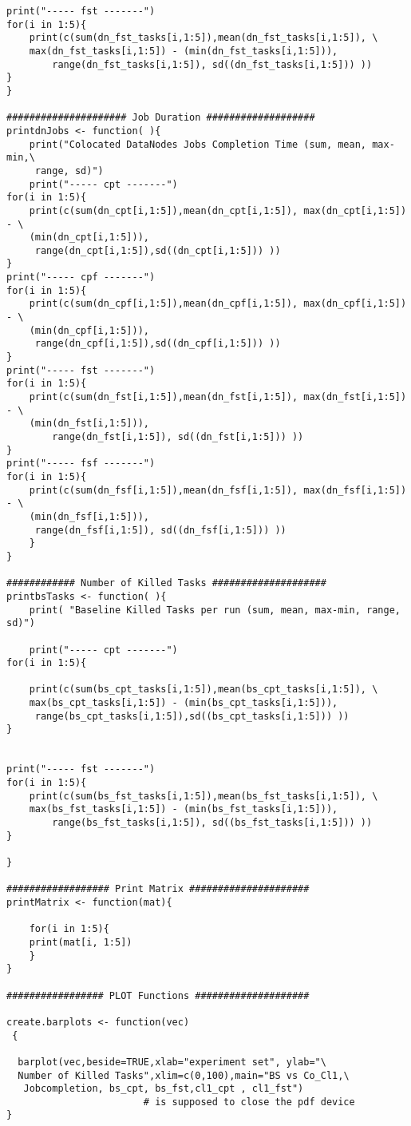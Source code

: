 \begin{verbatim}
print("----- fst -------")
for(i in 1:5){
	print(c(sum(dn_fst_tasks[i,1:5]),mean(dn_fst_tasks[i,1:5]), \
	max(dn_fst_tasks[i,1:5]) - (min(dn_fst_tasks[i,1:5])), 
		range(dn_fst_tasks[i,1:5]), sd((dn_fst_tasks[i,1:5])) ))
}
}

##################### Job Duration ###################
printdnJobs <- function( ){
	print("Colocated DataNodes Jobs Completion Time (sum, mean, max-min,\
	 range, sd)")
	print("----- cpt -------")
for(i in 1:5){
	print(c(sum(dn_cpt[i,1:5]),mean(dn_cpt[i,1:5]), max(dn_cpt[i,1:5]) - \
	(min(dn_cpt[i,1:5])),
	 range(dn_cpt[i,1:5]),sd((dn_cpt[i,1:5])) ))
}
print("----- cpf -------")
for(i in 1:5){
	print(c(sum(dn_cpf[i,1:5]),mean(dn_cpf[i,1:5]), max(dn_cpf[i,1:5]) - \
	(min(dn_cpf[i,1:5])),
	 range(dn_cpf[i,1:5]),sd((dn_cpf[i,1:5])) ))
}
print("----- fst -------")
for(i in 1:5){
	print(c(sum(dn_fst[i,1:5]),mean(dn_fst[i,1:5]), max(dn_fst[i,1:5]) - \
	(min(dn_fst[i,1:5])), 
		range(dn_fst[i,1:5]), sd((dn_fst[i,1:5])) ))
}
print("----- fsf -------")
for(i in 1:5){
	print(c(sum(dn_fsf[i,1:5]),mean(dn_fsf[i,1:5]), max(dn_fsf[i,1:5]) - \
	(min(dn_fsf[i,1:5])),
	 range(dn_fsf[i,1:5]), sd((dn_fsf[i,1:5])) ))
	}
}

############ Number of Killed Tasks ####################
printbsTasks <- function( ){
	print( "Baseline Killed Tasks per run (sum, mean, max-min, range, sd)")

	print("----- cpt -------")
for(i in 1:5){

	print(c(sum(bs_cpt_tasks[i,1:5]),mean(bs_cpt_tasks[i,1:5]), \
	max(bs_cpt_tasks[i,1:5]) - (min(bs_cpt_tasks[i,1:5])),
	 range(bs_cpt_tasks[i,1:5]),sd((bs_cpt_tasks[i,1:5])) ))
}


print("----- fst -------")
for(i in 1:5){
	print(c(sum(bs_fst_tasks[i,1:5]),mean(bs_fst_tasks[i,1:5]), \
	max(bs_fst_tasks[i,1:5]) - (min(bs_fst_tasks[i,1:5])), 
		range(bs_fst_tasks[i,1:5]), sd((bs_fst_tasks[i,1:5])) ))
}

}

################## Print Matrix #####################
printMatrix <- function(mat){

	for(i in 1:5){
	print(mat[i, 1:5])
	}
}

################# PLOT Functions ####################

create.barplots <- function(vec)
 {
 
  barplot(vec,beside=TRUE,xlab="experiment set", ylab="\
  Number of Killed Tasks",xlim=c(0,100),main="BS vs Co_Cl1,\
   Jobcompletion, bs_cpt, bs_fst,cl1_cpt , cl1_fst") 
                        # is supposed to close the pdf device
}


\end{verbatim}
